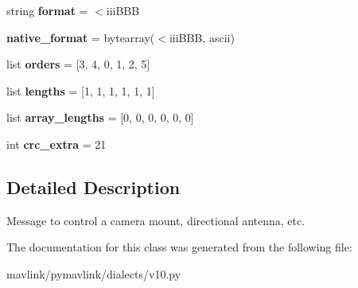\begin{DoxyCompactItemize}
string {\bfseries format} = \textquotesingle{}$<$iii\+B\+BB\textquotesingle{}
\item 
\mbox{\label{classpymavlink_1_1dialects_1_1v10_1_1MAVLink__mount__control__message_ad06ba024489d5475c2d9e2648c2b2368}} 
{\bfseries native\+\_\+format} = bytearray(\textquotesingle{}$<$iii\+B\+BB\textquotesingle{}, \textquotesingle{}ascii\textquotesingle{})
\item 
\mbox{\label{classpymavlink_1_1dialects_1_1v10_1_1MAVLink__mount__control__message_ad84d19f5cfd9b6286555b7803c0b8f2e}} 
list {\bfseries orders} = \mbox{[}3, 4, 0, 1, 2, 5\mbox{]}
\item 
\mbox{\label{classpymavlink_1_1dialects_1_1v10_1_1MAVLink__mount__control__message_ae844adb6354050ee8975a5a0b56812ce}} 
list {\bfseries lengths} = \mbox{[}1, 1, 1, 1, 1, 1\mbox{]}
\item 
\mbox{\label{classpymavlink_1_1dialects_1_1v10_1_1MAVLink__mount__control__message_a21dbd7e4a3264c82e2d708637df3b163}} 
list {\bfseries array\+\_\+lengths} = \mbox{[}0, 0, 0, 0, 0, 0\mbox{]}
\item 
\mbox{\label{classpymavlink_1_1dialects_1_1v10_1_1MAVLink__mount__control__message_a3ece264c36983a3fd6e31d7772445a88}} 
int {\bfseries crc\+\_\+extra} = 21
\end{DoxyCompactItemize}


\subsection{Detailed Description}
\begin{DoxyVerb}Message to control a camera mount, directional antenna, etc.
\end{DoxyVerb}
 

The documentation for this class was generated from the following file\+:\begin{DoxyCompactItemize}
\item 
mavlink/pymavlink/dialects/v10.\+py\end{DoxyCompactItemize}
